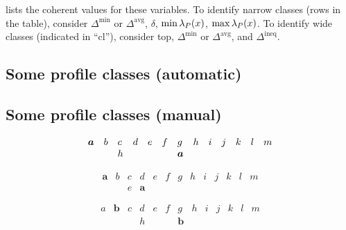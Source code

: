 \documentclass[pagesize, twoside=off, bibliography=totoc, DIV=calc, fontsize=12pt, a4paper]{scrartcl}
\begin{document}
 lists the coherent values for these variables. 
To identify narrow classes (rows in the table), consider $\Delta^\text{min}$ or $\Delta^\text{avg}$, $\delta$, $\min \lambda_P(x)$, $\max \lambda_P(x)$.
To identify wide classes (indicated in “cl”), consider top, $\Delta^\text{min}$ or $\Delta^\text{avg}$, and $\Delta^\text{ineq}$.

\subsection{Some profile classes (automatic)}


\subsection{Some profile classes (manual)}
\begin{example}[$\Delta^\text{min} = 2$; $\delta = 1$; $\lprof(x) = (0, 6)$ thus cl $1$]
	\label{ex1.1}
	\begin{equation}
		\begin{array}{*{13}l}
			\bm{a}	& b	& c	& d	& e	& f	& g	& h	& i & j & k & l & m\\
			& & h & & & & \bm{a}
		\end{array} 
	\end{equation}
\end{example}

\begin{example}[$\Delta^\text{min} = 2$; $\delta = 1$; $\lprof(x) = (0, 3)$ thus cl $1$]
	\label{ex:06}
	\begin{equation}
		\begin{array}{lllllllllllll}
			\bm{a}	& b	& c	& d	& e	& f	& g	& h	& i & j & k & l & m\\
			& & e & \bm{a}
		\end{array}
	\end{equation}
\end{example}

\begin{example}[$\Delta^\text{min} = 2$; $\delta = 1$; $\lprof(x) = (1, 6)$ thus cl $11$]
	\begin{equation}
		\begin{array}{lllllllllllll}
			a	& \bm{b}	& c	& d	& e	& f	& g	& h	& i & j & k & l & m\\
			& & & h & & & \bm{b}
		\end{array}
	\end{equation}
\end{example}
\end{document}
